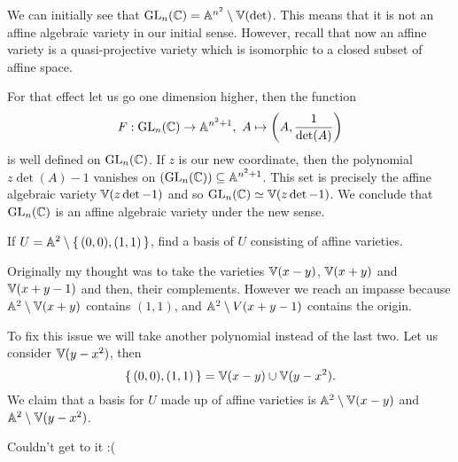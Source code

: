 \documentclass[12pt]{memoir}
\begin{document}
  \begin{ptcbr}
    We can initially see that $\mathrm{GL}_n(\mathbb{C})=\mathbb{A}^{n^2}\setminus\mathbb{V}(\det)$. This means that it is not an affine algebraic variety in our initial sense. However, recall that now an affine variety is a quasi-projective variety which is isomorphic to a closed subset of affine space.\par 
    For that effect let us go one dimension higher, then the function 
    $$F:\rGL_n(\bC)\to\bA^{n^2+1},\ A\mapsto\left(A,\frac{1}{\det(A)}\right)$$
    is well defined on $\mathrm{GL}_n(\mathbb{C})$. If $z$ is our new coordinate, then the polynomial $z\det(A)-1$ vanishes on $\relax(\mathrm{GL}_n(\mathbb{C}))\subseteq\mathbb{A}^{n^2+1}$. This set is precisely the affine algebraic variety $\mathbb{V}(z\det-1)$ and so $\mathrm{GL}_n(\mathbb{C})\simeq \mathbb{V}(z\det-1)$. We conclude that $\mathrm{GL}_n(\mathbb{C})$ is an affine algebraic variety under the new sense. 
  \end{ptcbr}
  \begin{Ej}
    If $U=\mathbb{A}^2\setminus\{\,(0,0),(1,1)\,\}$, find a basis of $U$ consisting of affine varieties.
  \end{Ej}

  \begin{ptcbr}
    Originally my thought was to take the varieties $\mathbb{V}(x-y)$, $\mathbb{V}(x+y)$ and $\mathbb{V}(x+y-1)$ and then, their complements. However we reach an impasse because $\mathbb{A}^2\setminus\mathbb{V}(x+y)$ contains $(1,1)$, and $\mathbb{A}^2\setminus V(x+y-1)$ contains the origin.\par 
    To fix this issue we will take another polynomial instead of the last two. Let us consider $\mathbb{V}(y-x^2)$, then 
    $$\{\,(0,0),(1,1)\,\}=\mathbb{V}(x-y)\cup\mathbb{V}(y-x^2).$$
    We claim that a basis for $U$ made up of affine varieties is $\mathbb{A}^2\setminus \mathbb{V}(x-y)$ and $\mathbb{A}^2\setminus\mathbb{V}(y-x^2)$. 
  \end{ptcbr}

  \begin{Ej}
    Couldn't get to it :(
  \end{Ej}
\end{document}
